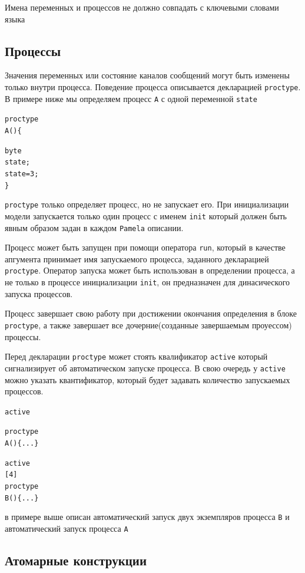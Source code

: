 \documentclass[12pt, twoside]{report}
\newcommand{\cname}[1] {
\textcolor{atnotation}{#1}
}
\begin{document}
Имена переменных и процессов не должно совпадать с ключевыми словами языка 

\subsection*{Процессы}\label{promela_language_PROCESS}

Значения переменных или состояние каналов сообщений могут быть изменены только внутри процесса.
Поведение процесса описывается декларацией \texttt{proctype}. В примере ниже мы определяем процесс
\texttt{A} с одной переменной \texttt{state}
\begin{alltt}
\cname{proctype} A() \{
  \cname{byte} state;
  state = 3;
\}
\end{alltt}
\texttt{proctype} только определяет процесс, но не запускает его. При инициализации модели
запускается только один процесс с именем \texttt{init} который должен быть явным образом задан в
каждом \texttt{Pamela} описании.

Процесс может быть запущен при помощи оператора \texttt{run}, который в качестве апгумента принимает
имя запускаемого процесса, заданного декларацией \texttt{proctype}. Оператор запуска может быть использован в
определении процесса, а не только в процессе инициализации \texttt{init}, он предназначен для динасического
запуска процессов.

Процесс завершает свою работу при достижении окончания определения в блоке \texttt{proctype}, а также завершает
все дочерние(созданные завершаемым проуессом) процессы.

Перед декларации \texttt{proctype} может стоять квалификатор \texttt{active} который сигнализирует
об автоматическом запуске процесса. В свою очередь у \texttt{active} можно указать квантификатор,
который будет задавать количество запускаемых процессов.

\begin{alltt}
\cname{active} \cname{proctype} A() \{ ... \}
\cname{active} [4] \cname{proctype} B() \{ ... \}
\end{alltt}
в примере выше описан автоматический запуск двух экземпляров процесса \texttt{B}
и автоматический запуск процесса \texttt{A}

\subsection*{Атомарные конструкции}\label{promela_language_ATOMIC}
\end{document}
